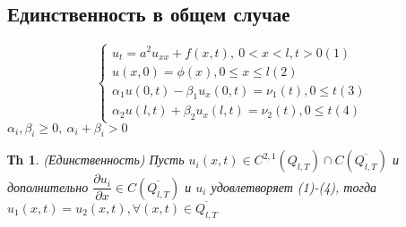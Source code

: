 \documentclass[14pt]{article}
\theoremstyle{plain}
\newtheorem{Thm}{Тh}
\theoremstyle{definition}
\begin{document}
		\subsection{Единственность в общем случае}
				\begin{equation*}
				\left\{ 
				\begin{array}{ll} 
					u_t = a^2 u_{xx} + f(x,t), \ 0 < x < l, t > 0 (1)\\
					u(x,0) = \phi(x), 0 \leq x \leq l  (2)\\
					\alpha_1 u(0,t) - \beta_1 u_x(0,t) = \nu_1(t),  0 \leq t (3)\\
					\alpha_2 u(l,t) + \beta_2 u_x(l,t)= \nu_2(t), 0 \leq t  (4) \end{array}\right.
			\end{equation*}
			$\alpha_i, \beta_i \geq 0, \ \alpha_i + \beta_i > 0$
			\begin{Thm}
				(Единственность)\newline
				Пусть $u_i(x,t) \in C^{2,1} (Q_{l, T}) \cap C(\overline{Q_{l,T}})$ и дополнительно $\dfrac{\partial u_i}{\partial x} \in C(\overline{Q_{l,T}})$ и $u_i$ удовлетворяет (1)-(4), тогда $u_1(x,t) = u_2(x,t), \forall (x,t) \in \overline{Q_{l,T}}$
			\end{Thm}
\end{document}
